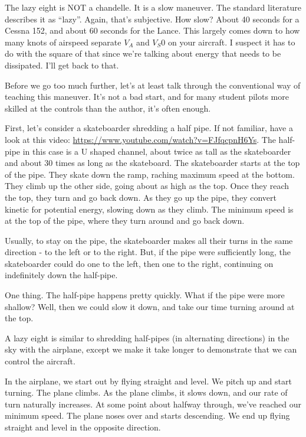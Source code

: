 The lazy eight is NOT a chandelle. It is a slow maneuver. The standard literature describes it as ``lazy''. Again, that's subjective. How slow? About 40 seconds for a Cessna 152, and about 60 seconds for the Lance. This largely comes down to how many knots of airspeed separate $V_A$ and $V_S0$ on your aircraft. I suspect it has to do with the square of that since we're talking about energy that needs to be dissipated. I'll get back to that.

Before we go too much further, let's at least talk through the conventional way of teaching this maneuver. It's not a bad start, and for many student pilots more skilled at the controls than the author, it's often enough.

First, let's consider a skateboarder shredding a half pipe. If not familiar, have a look at this video: \url{https://www.youtube.com/watch?v=FJfqcpnH6Ys}. The half-pipe in this case is a U shaped channel, about twice as tall as the skateboarder and about 30 times as long as the skateboard. The skateboarder starts at the top of the pipe. They skate down the ramp, raching maximum speed at the bottom. They climb up the other side, going about as high as the top. Once they reach the top, they turn and go back down. As they go up the pipe, they convert kinetic for potential energy, slowing down as they climb. The minimum speed is at the top of the pipe, where they turn around and go back down.

Usually, to stay on the pipe, the skateboarder makes all their turns in the same direction - to the left or to the right. But, if the pipe were sufficiently long, the skateboarder could do one to the left, then one to the right, continuing on indefinitely down the half-pipe.

One thing. The half-pipe happens pretty quickly. What if the pipe were more shallow? Well, then we could slow it down, and take our time turning around at the top.

A lazy eight is similar to shredding half-pipes (in alternating directions) in the sky with the airplane, except we make it take longer to demonstrate that we can control the aircraft.

In the airplane, we start out by flying straight and level. We pitch up and start turning. The plane climbs. As the plane climbs, it slows down, and our rate of turn naturally increases. At some point about halfway through, we've reached our minimum speed. The plane noses over and starts descending. We end up flying straight and level in the opposite direction.

